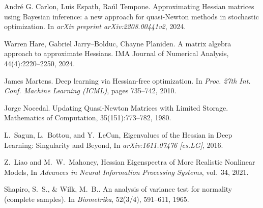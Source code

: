 \documentclass[a4paper,12pt]{article}
\begin{document}
\begin{thebibliography}{99}
  André G. Carlon, Luis Espath, Raúl Tempone.
  \newblock Approximating Hessian matrices using Bayesian inference: a new approach for quasi-Newton methods
  in stochastic optimization.
  \newblock In \emph{arXiv preprint arXiv:2208.00441v2}, 2024.

  Warren Hare, Gabriel Jarry–Bolduc, Chayne Planiden.
  \newblock A matrix algebra approach to approximate Hessians.
  \newblock IMA Journal of Numerical Analysis, 44(4):2220–2250, 2024.

  James Martens.
  \newblock Deep learning via Hessian-free optimization.
  \newblock In {\em Proc. 27th Int. Conf. Machine Learning (ICML)}, pages 735–742, 2010.

  Jorge Nocedal.
  \newblock Updating Quasi-Newton Matrices with Limited Storage.
  \newblock Mathematics of Computation, 35(151):773–782, 1980.

  L.~Sagun, L.~Bottou, and Y.~LeCun,
  \newblock Eigenvalues of the Hessian in Deep Learning: Singularity and Beyond,
  \newblock In \emph{arXiv:1611.07476 [cs.LG]}, 2016.

  Z.~Liao and M.~W.~Mahoney,
  \newblock Hessian Eigenspectra of More Realistic Nonlinear Models,
  \newblock In \emph{Advances in Neural Information Processing Systems}, vol.~34, 2021.

  Shapiro, S.~S., \& Wilk, M.~B..
  \newblock An analysis of variance test for normality (complete samples).
  \newblock In \emph{Biometrika}, 52(3/4), 591–611, 1965.

\end{thebibliography}
\end{document}
